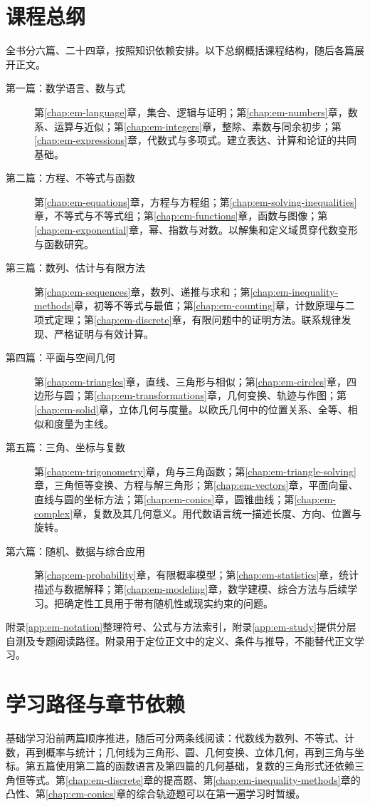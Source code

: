 \documentclass[UTF8]{ctexbook}
\begin{document}
\section*{课程总纲}
全书分六篇、二十四章，按照知识依赖安排。以下总纲概括课程结构，随后各篇展开正文。
\begin{description}
  \item[第一篇：数学语言、数与式]
  第\ref{chap:em-language}章，集合、逻辑与证明；第\ref{chap:em-numbers}章，数系、运算与近似；第\ref{chap:em-integers}章，整除、素数与同余初步；第\ref{chap:em-expressions}章，代数式与多项式。建立表达、计算和论证的共同基础。
  \item[第二篇：方程、不等式与函数]
  第\ref{chap:em-equations}章，方程与方程组；第\ref{chap:em-solving-inequalities}章，不等式与不等式组；第\ref{chap:em-functions}章，函数与图像；第\ref{chap:em-exponential}章，幂、指数与对数。以解集和定义域贯穿代数变形与函数研究。
  \item[第三篇：数列、估计与有限方法]
  第\ref{chap:em-sequences}章，数列、递推与求和；第\ref{chap:em-inequality-methods}章，初等不等式与最值；第\ref{chap:em-counting}章，计数原理与二项式定理；第\ref{chap:em-discrete}章，有限问题中的证明方法。联系规律发现、严格证明与有效计算。
  \item[第四篇：平面与空间几何]
  第\ref{chap:em-triangles}章，直线、三角形与相似；第\ref{chap:em-circles}章，四边形与圆；第\ref{chap:em-transformations}章，几何变换、轨迹与作图；第\ref{chap:em-solid}章，立体几何与度量。以欧氏几何中的位置关系、全等、相似和度量为主线。
  \item[第五篇：三角、坐标与复数]
  第\ref{chap:em-trigonometry}章，角与三角函数；第\ref{chap:em-triangle-solving}章，三角恒等变换、方程与解三角形；第\ref{chap:em-vectors}章，平面向量、直线与圆的坐标方法；第\ref{chap:em-conics}章，圆锥曲线；第\ref{chap:em-complex}章，复数及其几何意义。用代数语言统一描述长度、方向、位置与旋转。
  \item[第六篇：随机、数据与综合应用]
  第\ref{chap:em-probability}章，有限概率模型；第\ref{chap:em-statistics}章，统计描述与数据解释；第\ref{chap:em-modeling}章，数学建模、综合方法与后续学习。把确定性工具用于带有随机性或现实约束的问题。
\end{description}
附录\ref{app:em-notation}整理符号、公式与方法索引，附录\ref{app:em-study}提供分层自测及专题阅读路径。附录用于定位正文中的定义、条件与推导，不能替代正文学习。

\section*{学习路径与章节依赖}
基础学习沿前两篇顺序推进，随后可分两条线阅读：代数线为数列、不等式、计数，再到概率与统计；几何线为三角形、圆、几何变换、立体几何，再到三角与坐标。第五篇使用第二篇的函数语言及第四篇的几何基础，复数的三角形式还依赖三角恒等式。第\ref{chap:em-discrete}章的提高题、第\ref{chap:em-inequality-methods}章的凸性、第\ref{chap:em-conics}章的综合轨迹题可以在第一遍学习时暂缓。
\end{document}
